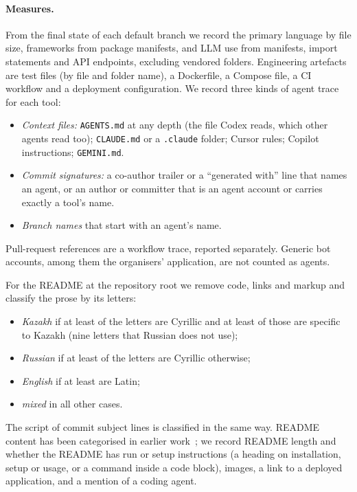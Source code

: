 \documentclass{article}
\begin{document}
\paragraph{Measures.}
From the final state of each default branch we record the primary language by file size, frameworks from package manifests, and LLM use from manifests, import statements and API endpoints, excluding vendored folders. Engineering artefacts are test files (by file and folder name), a Dockerfile, a Compose file, a CI workflow and a deployment configuration. We record three kinds of agent trace for each tool:
\begin{itemize}[compact]
  \item \emph{Context files:} \texttt{AGENTS.md} at any depth (the file Codex reads, which other agents read too); \texttt{CLAUDE.md} or a \texttt{.claude} folder; Cursor rules; Copilot instructions; \texttt{GEMINI.md}.
  \item \emph{Commit signatures:} a co-author trailer or a ``generated with'' line that names an agent, or an author or committer that is an agent account or carries exactly a tool's name.
  \item \emph{Branch names} that start with an agent's name.
\end{itemize}
Pull-request references are a workflow trace, reported separately. Generic bot accounts, among them the organisers' application, are not counted as agents.

For the README at the repository root we remove code, links and markup and classify the prose by its letters:
\begin{itemize}[compact]
  \item \emph{Kazakh} if at least \thrcyr{} of the letters are Cyrillic and at least \thrkaz{} of those are specific to Kazakh (nine letters that Russian does not use);
  \item \emph{Russian} if at least \thrcyr{} of the letters are Cyrillic otherwise;
  \item \emph{English} if at least \thrlat{} are Latin;
  \item \emph{mixed} in all other cases.
\end{itemize}
The script of commit subject lines is classified in the same way. README content has been categorised in earlier work~\cite{prana2019readme}; we record README length and whether the README has run or setup instructions (a heading on installation, setup or usage, or a command inside a code block), images, a link to a deployed application, and a mention of a coding agent.
\end{document}
